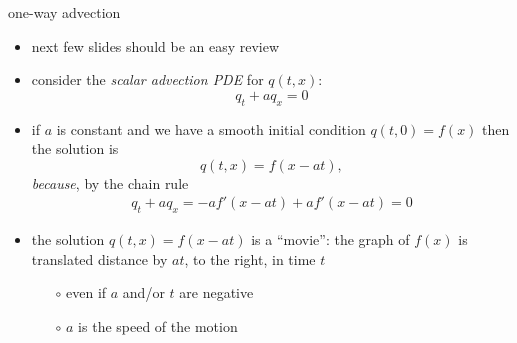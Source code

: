 \documentclass[10pt,dvipsnames,usepdftitle=false,
hyperref={pdftitle = {Finite volume methods},
    pdfauthor = {Ed Bueler}}]{beamer}
\begin{document}
\begin{frame}{one-way advection}

\begin{itemize}
\item next few slides should be an easy review
\item consider the \emph{scalar advection PDE} for $q(t,x)$:
    $$q_t + a q_x=0$$

\item if $a$ is constant and we have a smooth initial condition $q(t,0)=f(x)$ then the solution is
    $$q(t,x) = f(x-at),$$
\emph{because}, by the chain rule
\begin{gather*}
q_t + a q_x = -a f'(x-at) + a f'(x-at) = 0
\end{gather*}
\item the solution $q(t,x)=f(x-at)$ is a ``movie'': the graph of $f(x)$ is translated distance by $at$, to the right, in time $t$
    \begin{itemize}
    \item[$\circ$] even if $a$ and/or $t$ are negative
    \item[$\circ$] $a$ is the speed of the motion
    \end{itemize}
\end{itemize}
\end{frame}
\end{document}
